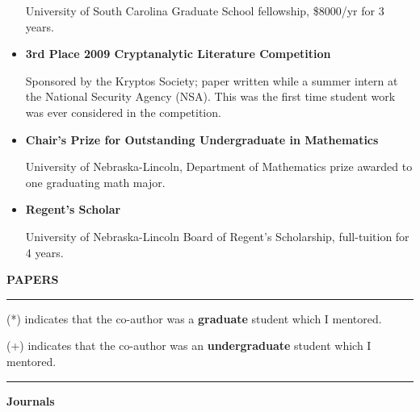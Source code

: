 \documentclass{article}
\begin{document}
\begin{itemize}
	    University of South Carolina Graduate School fellowship, \$8000/yr for 3 years.

		\item \textbf{3rd Place 2009 Cryptanalytic Literature Competition}

		Sponsored by the Kryptos Society; paper written while a summer intern at the National Security Agency (NSA).
		This was the first time student work was ever considered in the competition.

		\item \textbf{Chair's Prize for Outstanding Undergraduate in Mathematics}

		University of Nebraska-Lincoln, Department of Mathematics prize awarded to one graduating math major.

		\item \textbf{Regent's Scholar}
        
		University of Nebraska-Lincoln Board of Regent's Scholarship, full-tuition for 4 years.

	\end{itemize}

\vspace{.25 in}



\noindent \LARGE \textbf{PAPERS}\normalsize

\noindent \rule{\textwidth}{1px}

\noindent (*) indicates that the co-author was a \textbf{graduate} student which I mentored.

\noindent (+) indicates that the co-author was an \textbf{undergraduate} student which I mentored.

\noindent \rule{\textwidth}{1px}

\medskip

\noindent \Large \textbf{Journals} \normalsize

\medskip
\end{document}
